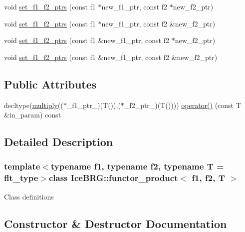 \begin{DoxyCompactItemize}
\item 
void \hyperlink{classIceBRG_1_1functor__product_a3072914bbe8c66121a78f805c0d31863}{set\+\_\+f1\+\_\+f2\+\_\+ptrs} (const f1 $\ast$new\+\_\+f1\+\_\+ptr, const f2 $\ast$new\+\_\+f2\+\_\+ptr)
\item 
void \hyperlink{classIceBRG_1_1functor__product_ab9fe7a8e4510075b196868f5ae9d1898}{set\+\_\+f1\+\_\+f2\+\_\+ptrs} (const f1 $\ast$new\+\_\+f1\+\_\+ptr, const f2 \&new\+\_\+f2\+\_\+ptr)
\item 
void \hyperlink{classIceBRG_1_1functor__product_a9000d20f7ec8b19e3c060667732f6884}{set\+\_\+f1\+\_\+f2\+\_\+ptrs} (const f1 \&new\+\_\+f1\+\_\+ptr, const f2 $\ast$new\+\_\+f2\+\_\+ptr)
\item 
void \hyperlink{classIceBRG_1_1functor__product_af0d675d9ce214c766dc6b92b20373bfc}{set\+\_\+f1\+\_\+f2\+\_\+ptrs} (const f1 \&new\+\_\+f1\+\_\+ptr, const f2 \&new\+\_\+f2\+\_\+ptr)
\end{DoxyCompactItemize}
\subsection*{Public Attributes}
\begin{DoxyCompactItemize}
\item 
decltype(\hyperlink{namespaceIceBRG_ab535c998baac3ffc8412fdbae750b7d1}{multiply}(($\ast$\+\_\+f1\+\_\+ptr\+\_\+)(T()),($\ast$\+\_\+f2\+\_\+ptr\+\_\+)(T()))) \hyperlink{classIceBRG_1_1functor__product_a4f55bb9a66aba664a8c73f8c5172ac24}{operator()} (const T \&in\+\_\+param) const 
\end{DoxyCompactItemize}


\subsection{Detailed Description}
\subsubsection*{template$<$typename f1, typename f2, typename T = flt\+\_\+type$>$class Ice\+B\+R\+G\+::functor\+\_\+product$<$ f1, f2, T $>$}

Class definitions 

\subsection{Constructor \& Destructor Documentation}
\hypertarget{classIceBRG_1_1functor__product_a263de47cbf8a828c15f4e74177f59801}{}
